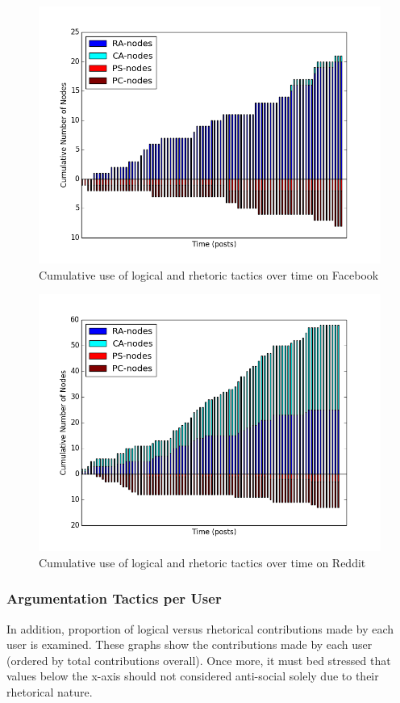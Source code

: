 \begin{figure}
\centering
\includegraphics[scale=\scaleResults]{./figures/rhetoric_over_time/facebook.png}
\caption{Cumulative use of logical and rhetoric tactics over time on Facebook}
\label{figure:rhetorictime:Facebook}
\end{figure}

\begin{figure}
\centering
\includegraphics[scale=\scaleResults]{./figures/rhetoric_over_time/reddit.png}
\caption{Cumulative use of logical and rhetoric tactics over time on Reddit}
\label{figure:rhetorictime:reddit}
\end{figure}


\subsubsection{Argumentation Tactics per User}
In addition, proportion of logical versus rhetorical contributions made by each user is examined. These graphs show the contributions made by each user (ordered by total contributions overall). Once more, it must bed stressed that values below the x-axis should not considered anti-social solely due to their rhetorical nature.

